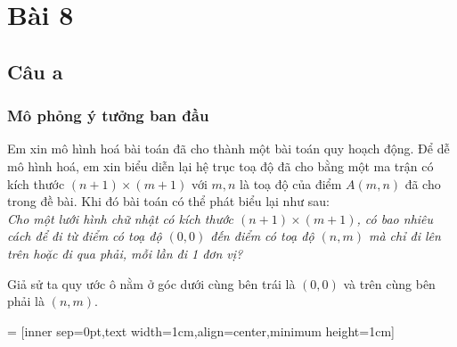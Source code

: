 \documentclass[main.tex]{subfiles}
\begin{document}
\section{Bài 8}

\renewcommand{\a}[2]{\ensuremath{\a_{#1,\ #2}}}
\newcommand{\s}{\ensuremath{\mathcal S} }

\subsection{Câu a}
\subsubsection{Mô phỏng ý tưởng ban đầu}
Em xin mô hình hoá bài toán đã cho thành một bài toán quy hoạch động. Để dễ mô hình hoá, em xin biểu diễn lại hệ trục toạ độ đã cho bằng một ma trận có kích thước $(n+1)\times (m+1)$ với $m, n$ là toạ độ của điểm $A(m,n)$ đã cho trong đề bài. Khi đó bài toán có thể phát biểu lại như sau:\\
\textit{Cho một lưới hình chữ nhật có kích thước $(n+1)\times(m+1)$, có bao nhiêu cách để đi từ điểm có toạ độ $(0, 0)$ đến điểm có toạ độ $(n, m)$ mà chỉ đi lên trên hoặc đi qua phải, mỗi lần đi 1 đơn vị?}\bigskip

Giả sử ta quy ước ô nằm ở góc dưới cùng bên trái là $(0,0)$ và trên cùng bên phải là $(n,m)$.\par

 = [inner sep=0pt,text width=1cm,align=center,minimum height=1cm]
\newcommand{\empt}{\hphantom{1pt}}

\begin{figure}
    \vspace*{-1cm}
\end{figure}
\end{document}
